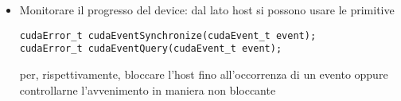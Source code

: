 \begin{questions}
\begin{solution}
\begin{itemize}
            \item Monitorare il progresso del device: dal lato host si possono usare le primitive
            \begin{verbatim}
cudaError_t cudaEventSynchronize(cudaEvent_t event);
cudaError_t cudaEventQuery(cudaEvent_t event);
            \end{verbatim}
            per, rispettivamente, bloccare l'host fino all'occorrenza di un evento oppure controllarne l'avvenimento in maniera non bloccante
        \end{itemize}
    \end{solution}
    
\end{questions}